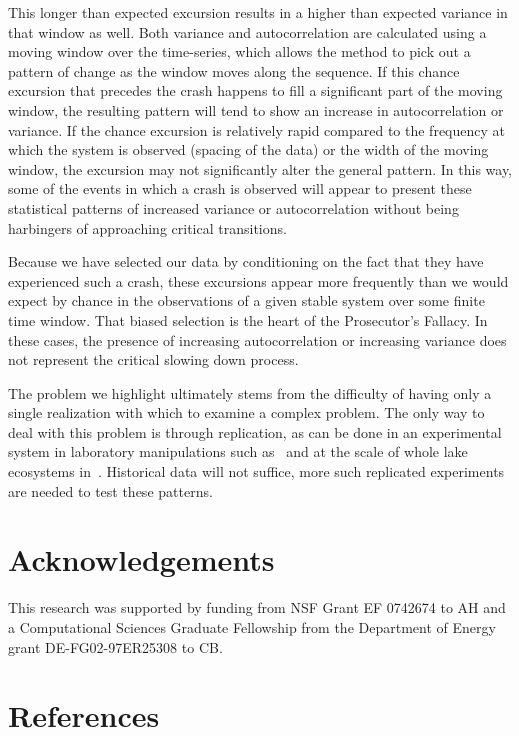 \documentclass[authoryear,review,12pt]{elsarticle}
\begin{document}
This longer than expected excursion results in a higher than expected variance
in that window as well. Both variance and autocorrelation are calculated using
a moving window over the time-series, which allows the method to pick out a 
pattern of change as the window moves along the sequence. If this chance excursion 
that precedes the crash happens to fill a significant part of the moving window,
the resulting pattern will tend to show an increase in autocorrelation or variance.
If the chance excursion is relatively rapid compared to the frequency at which
the system is observed (spacing of the data) or the width of the moving window, 
the excursion may not significantly alter the general pattern.  In this way, 
some of the events in which a crash is observed will appear to present these
statistical patterns of increased variance or autocorrelation without being
harbingers of approaching critical transitions.  

Because we have selected our data by conditioning
on the fact that they have experienced such a crash, these excursions appear
more frequently than we would expect by chance in the observations of a given
stable system over some finite time window.  That biased selection is the
heart of the Prosecutor's Fallacy.  In these cases, the presence of increasing
autocorrelation or increasing variance does not represent the critical slowing
down process.

The problem we highlight ultimately stems from the difficulty of having only a
single realization with which to examine a complex problem.  The only way to deal
with this problem is through replication, as can be done in an experimental system
in laboratory manipulations such as~\citet{Drake2010, Veraart2011} and at the 
scale of whole lake ecosystems in~\citet{Carpenter2011}.  Historical data will 
not suffice, more such replicated experiments are needed to test these patterns.  



 \section{Acknowledgements}
This research was supported by funding from NSF Grant EF 0742674 to AH
and a Computational Sciences Graduate Fellowship from the Department of Energy grant DE-FG02-97ER25308 to CB. 
 \section{References}%
 
 
\end{document}
